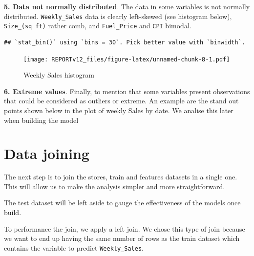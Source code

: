 \documentclass[11pt,]{article}
\newenvironment{Shaded}{\begin{snugshade}}{\end{snugshade}}
\newcommand{\KeywordTok}[1]{\textcolor[rgb]{0.13,0.29,0.53}{\textbf{{#1}}}}
\newcommand{\DataTypeTok}[1]{\textcolor[rgb]{0.13,0.29,0.53}{{#1}}}
\newcommand{\FloatTok}[1]{\textcolor[rgb]{0.00,0.00,0.81}{{#1}}}
\newcommand{\StringTok}[1]{\textcolor[rgb]{0.31,0.60,0.02}{{#1}}}
\newcommand{\CommentTok}[1]{\textcolor[rgb]{0.56,0.35,0.01}{\textit{{#1}}}}
\newcommand{\NormalTok}[1]{{#1}}
\begin{document}
\textbf{5. Data not normally distributed}. The data in some variables is
not normally distributed. \texttt{Weekly\_Sales} data is clearly
left-skewed (see histogram below), \texttt{Size\_(sq\ ft)} rather comb,
and \texttt{Fuel\_Price} and \texttt{CPI} bimodal.

\begin{Shaded}
\end{Shaded}

\begin{verbatim}
## `stat_bin()` using `bins = 30`. Pick better value with `binwidth`.
\end{verbatim}

\begin{figure}[htbp]
\centering
\texttt{[image: REPORTv12\_files/figure-latex/unnamed-chunk-8-1.pdf]}
\caption{Weekly Sales histogram}
\end{figure}

\textbf{6. Extreme values}. Finally, to mention that some variables
present observations that could be considered as outliers or extreme. An
example are the stand out points shown below in the plot of weekly Sales
by date. We analise this later when building the model

\section{Data joining}\label{data-joining}

The next step is to join the stores, train and features datasets in a
single one. This will allow us to make the analysis simpler and more
straightforward.

The test dataset will be left aside to gauge the effectiveness of the
models once build.

To performance the join, we apply a left join. We chose this type of
join because we want to end up having the same number of rows as the
train dataset which contains the variable to predict
\texttt{Weekly\_Sales}.
\end{document}
